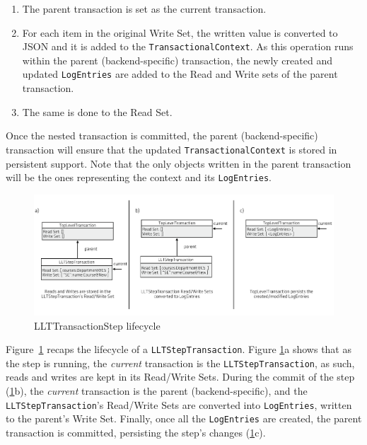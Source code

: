 \documentclass{llncs}
\begin{document}
\begin{enumerate}

\item The parent transaction is set as the current transaction.

\item For each item in the original Write Set, the written value is
  converted to JSON and it is added to the
  \texttt{TransactionalContext}. As this operation runs within the
  parent (backend-specific) transaction, the newly created and updated
  \texttt{LogEntries} are added to the Read and Write sets of the
  parent transaction.

\item The same is done to the Read Set.

\end{enumerate}

Once the nested transaction is committed, the parent
(backend-specific) transaction will ensure that the updated
\texttt{TransactionalContext} is stored in persistent support. Note
that the only objects written in the parent transaction will be the
ones representing the context and its \texttt{LogEntries}.

\begin{figure}
\centering
\includegraphics[width=1\linewidth]{llt-step-lifecycle}
\caption{LLTTransactionStep lifecycle}
\label{fig:llt-lifecycle}
\end{figure}

Figure~\ref{fig:llt-lifecycle} recaps the lifecycle of a
\texttt{LLTStepTransaction}. Figure \ref{fig:llt-lifecycle}a shows
that as the step is running, the {\it current} transaction is the
\texttt{LLTStepTransaction}, as such, reads and writes are kept in its
Read/Write Sets. During the commit of the step
(\ref{fig:llt-lifecycle}b), the {\it current} transaction is the
parent (backend-specific), and the \texttt{LLTStepTransaction}'s
Read/Write Sets are converted into \texttt{LogEntries}, written to the
parent's Write Set. Finally, once all the \texttt{LogEntries} are
created, the parent transaction is committed, persisting the step's
changes (\ref{fig:llt-lifecycle}c).
\end{document}
